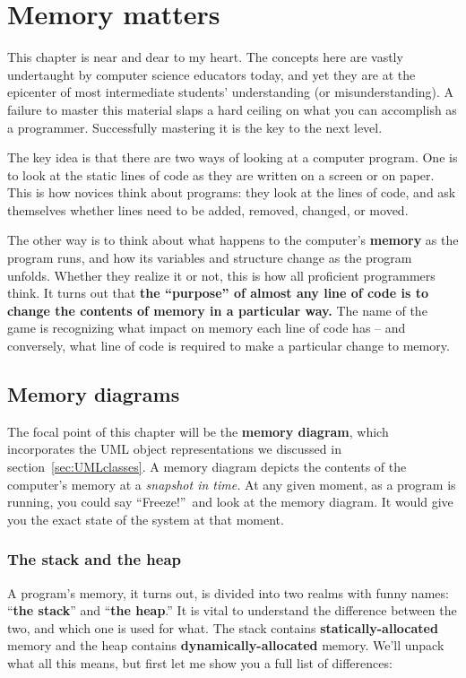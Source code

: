 
\chapter{Memory matters}
\label{ch:memoryMatters}

This chapter is near and dear to my heart. The concepts here are vastly
undertaught by computer science educators today, and yet they are at the
epicenter of most intermediate students' understanding (or misunderstanding).
A failure to master this material slaps a hard ceiling on what you can
accomplish as a programmer. Successfully mastering it is the key to the next
level.

The key idea is that there are two ways of looking at a computer program. One
is to look at the static lines of code as they are written on a screen or on
paper. This is how novices think about programs: they look at the lines of
code, and ask themselves whether lines need to be added, removed, changed, or
moved.

The other way is to think about what happens to the computer's \textbf{memory}
as the program runs, and how its variables and structure change as the program
unfolds. Whether they realize it or not, this is how all proficient
programmers think. It turns out that \textbf{the ``purpose'' of almost any line
of code is to change the contents of memory in a particular way.} The name of
the game is recognizing what impact on memory each line of code has -- and
conversely, what line of code is required to make a particular change to
memory.

\section{Memory diagrams}

The focal point of this chapter will be the \textbf{memory diagram}, which
incorporates the UML object representations we discussed in
section~\ref{sec:UMLclasses}. A memory diagram depicts the contents of the
computer's memory at a \textit{snapshot in time.} At any given moment, as a
program is running, you could say ``Freeze!''\ and look at the memory diagram.
It would give you the exact state of the system at that moment.

\subsection{The stack and the heap}

A program's memory, it turns out, is divided into two realms with funny names:
``\textbf{the stack}'' and ``\textbf{the heap}.'' It is vital to understand the
difference between the two, and which one is used for what. The stack contains
\textbf{statically-allocated} memory and the heap contains
\textbf{dynamically-allocated} memory. We'll unpack what all this means, but
first let me show you a full list of differences:

